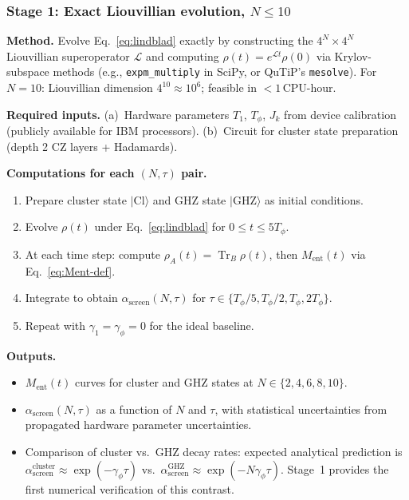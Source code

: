\documentclass[12pt,letterpaper]{article}
\theoremstyle{plain}
\theoremstyle{definition}
\newcommand{\asc}{\alpha_{\mathrm{screen}}}
\newcommand{\tr}{\operatorname{Tr}}
\begin{document}
\subsubsection*{Stage 1: Exact Liouvillian evolution, $N \leq 10$}

\textbf{Method.}
Evolve Eq.~\eqref{eq:lindblad} exactly by constructing the $4^N \times 4^N$ Liouvillian superoperator $\mathcal{L}$ and computing $\rho(t) = e^{\mathcal{L}t}\rho(0)$ via Krylov-subspace methods (e.g., \texttt{expm\_multiply} in SciPy, or QuTiP's \texttt{mesolve}).  For $N = 10$: Liouvillian dimension $4^{10} \approx 10^6$; feasible in $< 1$\,CPU-hour.

\textbf{Required inputs.}
(a)~Hardware parameters $T_1$, $T_\phi$, $J_k$ from device calibration (publicly available for IBM processors).
(b)~Circuit for cluster state preparation (depth 2 CZ layers + Hadamards).

\textbf{Computations for each $(N,\tau)$ pair.}
\begin{enumerate}[label=(\arabic*),noitemsep]
  \item Prepare cluster state $|\mathrm{Cl}\rangle$ and GHZ state $|\mathrm{GHZ}\rangle$ as initial conditions.
  \item Evolve $\rho(t)$ under Eq.~\eqref{eq:lindblad} for $0 \leq t \leq 5T_\phi$.
  \item At each time step: compute $\rho_A(t) = \tr_B\rho(t)$, then $M_{\mathrm{ent}}(t)$ via Eq.~\eqref{eq:Ment-def}.
  \item Integrate to obtain $\asc(N,\tau)$ for $\tau \in \{T_\phi/5, T_\phi/2, T_\phi, 2T_\phi\}$.
  \item Repeat with $\gamma_1 = \gamma_\phi = 0$ for the ideal baseline.
\end{enumerate}

\textbf{Outputs.}
\begin{itemize}[noitemsep]
  \item $M_{\mathrm{ent}}(t)$ curves for cluster and GHZ states at $N \in \{2,4,6,8,10\}$.
  \item $\asc(N,\tau)$ as a function of $N$ and $\tau$, with statistical uncertainties from propagated hardware parameter uncertainties.
  \item Comparison of cluster vs.\ GHZ decay rates: expected analytical prediction is
    $\asc^{\mathrm{cluster}} \approx \exp(-\gamma_\phi\tau)$ vs.\ $\asc^{\mathrm{GHZ}} \approx \exp(-N\gamma_\phi\tau)$.
    Stage~1 provides the first numerical verification of this contrast.
\end{itemize}
\end{document}
